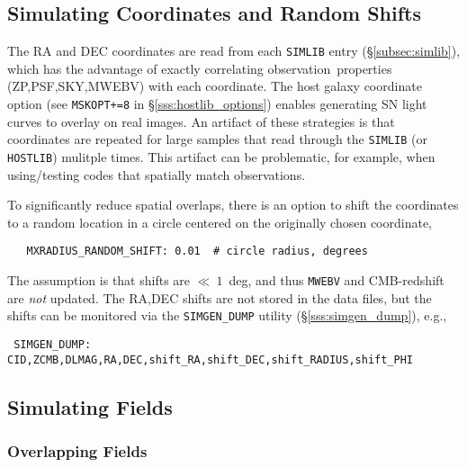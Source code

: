 \documentclass[12pt]{article}
\newcommand{\obs}{observation}
\newcommand{\obss}{observations}
\begin{document}
{%
 \subsection{Simulating Coordinates and Random Shifts}
 \label{subsec:simCoords}

The RA and DEC coordinates are read from each {\tt SIMLIB} entry  
(\S\ref{subsec:simlib}), which has the advantage of exactly correlating
\obs\ properties (ZP,PSF,SKY,MWEBV) with each coordinate.
The host galaxy coordinate option
(see {\tt MSKOPT+=8} in \S\ref{sss:hostlib_options})
enables generating SN light curves to overlay on real images.
An artifact of these strategies is that coordinates are repeated
for large samples that read through the {\tt SIMLIB} (or {\tt HOSTLIB})
mulitple times. This artifact can be problematic, for example,
when using/testing codes that spatially match \obss.

To significantly reduce spatial overlaps, there is an option to shift
the coordinates to a random location in a circle centered on the originally
chosen coordinate,
\begin{verbatim}
   MXRADIUS_RANDOM_SHIFT: 0.01  # circle radius, degrees
\end{verbatim}  
The assumption is that shifts are $\ll~1$~deg, and thus
{\tt MWEBV} and CMB-redshift are {\it not} updated. 
The RA,DEC shifts are not stored in the data files, but the shifts
can be monitored via the {\tt SIMGEN\_DUMP} utility
(\S\ref{sss:simgen_dump}), e.g.,
\begin{verbatim}
 SIMGEN_DUMP: CID,ZCMB,DLMAG,RA,DEC,shift_RA,shift_DEC,shift_RADIUS,shift_PHI
\end{verbatim}  


 \subsection{Simulating Fields}
 \label{subsec:simFields}

 \subsubsection{Overlapping Fields}
 \label{sss:overlap}

}
\end{document}
